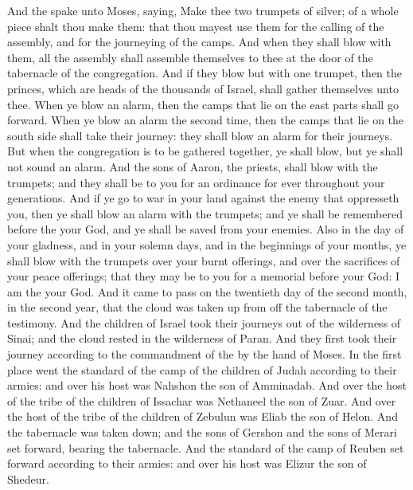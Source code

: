 \begin{biblechapter} %
 And the \LORD spake unto Moses, saying,
\verse Make thee two trumpets of silver; of a whole piece shalt thou make them: that thou mayest use them for the calling of the assembly, and for the journeying of the camps.
\verse And when they shall blow with them, all the assembly shall assemble themselves to thee at the door of the tabernacle of the congregation.
\verse And if they blow but with one trumpet, then the princes, which are heads of the thousands of Israel, shall gather themselves unto thee.
\verse When ye blow an alarm, then the camps that lie on the east parts shall go forward.
\verse When ye blow an alarm the second time, then the camps that lie on the south side shall take their journey: they shall blow an alarm for their journeys.
\verse But when the congregation is to be gathered together, ye shall blow, but ye shall not sound an alarm.
\verse And the sons of Aaron, the priests, shall blow with the trumpets; and they shall be to you for an ordinance for ever throughout your generations.
\verse And if ye go to war in your land against the enemy that oppresseth you, then ye shall blow an alarm with the trumpets; and ye shall be remembered before the \LORD your God, and ye shall be saved from your enemies.
\verse Also in the day of your gladness, and in your solemn days, and in the beginnings of your months, ye shall blow with the trumpets over your burnt offerings, and over the sacrifices of your peace offerings; that they may be to you for a memorial before your God: I am the \LORD your God.
 And it came to pass on the twentieth day of the second month, in the second year, that the cloud was taken up from off the tabernacle of the testimony.
\verse And the children of Israel took their journeys out of the wilderness of Sinai; and the cloud rested in the wilderness of Paran.
\verse And they first took their journey according to the commandment of the \LORD by the hand of Moses.
\verse In the first place went the standard of the camp of the children of Judah according to their armies: and over his host was Nahshon the son of Amminadab.
\verse And over the host of the tribe of the children of Issachar was Nethaneel the son of Zuar.
\verse And over the host of the tribe of the children of Zebulun was Eliab the son of Helon.
\verse And the tabernacle was taken down; and the sons of Gershon and the sons of Merari set forward, bearing the tabernacle.
\verse And the standard of the camp of Reuben set forward according to their armies: and over his host was Elizur the son of Shedeur.

\end{biblechapter}
